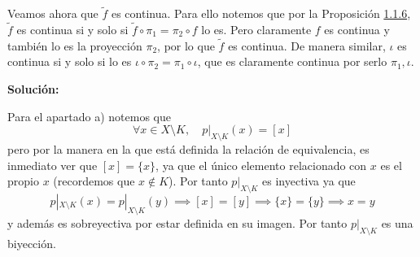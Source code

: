 {    Veamos ahora que $\tilde{f}$ es continua. Para ello notemos que por la Proposición \hyperref[prop:116]{1.1.6}, $\tilde{f}$ es continua si y solo si $\tilde{f}\circ\pi_1=\pi_2\circ f$ lo es. Pero claramente $f$ es continua y también lo es la proyección $\pi_2$, por lo que $\tilde{f}$ es continua. De manera similar, $\iota$ es continua si y solo si lo es $\iota\circ\pi_2=\pi_1\circ\iota$, que es claramente continua por serlo $\pi_1, \iota$.

}

\clearpage




\noindent\textbf{Solución:}

Para el apartado a) notemos que
\[
    \forall x \in X \setminus K,\quad p|_{X\setminus K}(x)=[x]
\]
pero por la manera en la que está definida la relación de equivalencia, es inmediato ver que $[x]=\{x\}$, ya que el único elemento relacionado con $x$ es el propio $x$ (recordemos que $x\notin K$). Por tanto $p|_{X\setminus K}$ es inyectiva ya que
\[
    p|_{X\setminus K}(x)=p|_{X\setminus K}(y)\implies [x]=[y]\implies \{x\}=\{y\}\implies x=y
\]
y además es sobreyectiva por estar definida en su imagen. Por tanto $p|_{X\setminus K}$ es una biyección.

